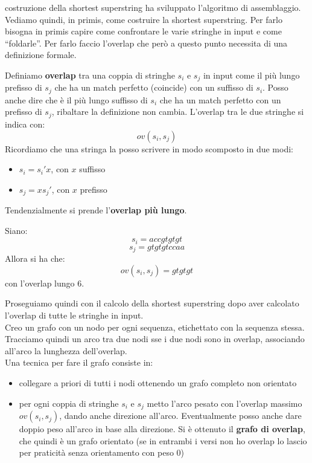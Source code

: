\documentclass[a4paper,12pt, oneside]{book}
\begin{document}
costruzione della shortest superstring ha sviluppato l'algoritmo di
assemblaggio. Vediamo quindi, in primis, come costruire la shortest
superstring. Per farlo bisogna in primis capire come confrontare le varie
stringhe in input e come ``foldarle''. Per farlo faccio l'overlap che però a
questo punto necessita di una definizione formale.
\begin{definizione}
  Definiamo \textbf{overlap} tra una coppia di stringhe $s_i$ e $s_j$ in input
  come il più lungo prefisso di $s_j$ che ha un match perfetto (coincide) con un
  suffisso di $s_i$. Posso anche dire che è il più lungo suffisso di $s_i$ che
  ha un match perfetto con un prefisso di $s_j$, ribaltare la definizione non
  cambia. L'overlap tra le due stringhe si indica con: 
  \[ov(s_i,s_j)\]
  Ricordiamo che una stringa la posso scrivere in modo scomposto in due modi:
  \begin{itemize}
    \item $s_i=s_i'x$, con $x$ suffisso
    \item $s_j=xs_j'$, con $x$ prefisso
  \end{itemize}
  Tendenzialmente si prende l'\textbf{overlap più lungo}.
\end{definizione}
\begin{esempio}
  Siano:
  \[s_i=accgtgtgt\]
  \[s_j=gtgtgtccaa\]
  Allora si ha che:
  \[ov(s_i,s_j)=gtgtgt\]
  con l'overlap lungo 6.
\end{esempio}
Proseguiamo quindi con il calcolo della shortest superstring dopo aver calcolato
l'overlap di tutte le stringhe in input.\\
Creo un grafo con un nodo per ogni sequenza, etichettato con la sequenza
stessa. Tracciamo quindi un arco tra due nodi sse i due nodi sono in overlap,
associando all'arco la lunghezza dell'overlap.\\
Una tecnica per fare il grafo consiste in:
\begin{itemize}
  \item collegare a priori di tutti i nodi ottenendo un grafo completo non
  orientato 
  \item per ogni coppia di stringhe $s_i$ e $s_j$ metto l'arco pesato con
  l'overlap massimo $ov(s_i,s_j)$, dando anche direzione all'arco. Eventualmente
  posso anche dare doppio peso all'arco in base alla direzione. Si è ottenuto il
  \textbf{grafo di overlap}, che quindi è un grafo orientato (se in entrambi i
  versi non ho overlap lo lascio per praticità senza orientamento con peso 0)
\end{itemize}
\end{document}
